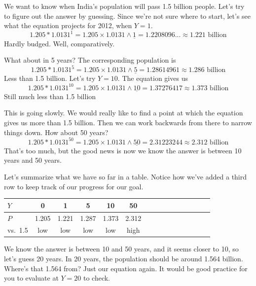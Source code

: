 We want to know when India's population will pass 1.5 billion people.  Let's try to figure out the answer by guessing.  Since we're not sure where to start, let's see what the equation projects for 2012, when $Y=1$. 
$$1.205 \ast 1.0131^1 = 1.205 \times 1.0131 \wedge \underline{1} = 1.2208096... \approx 1.221 \text{ billion}$$ 
Hardly budged.  Well, comparatively.  

What about in 5 years?  The corresponding population is 
$$1.205 \ast 1.0131^5 = 1.205 \times 1.0131 \wedge \underline{5} = 1.28614961\approx  1.286\text{ billion}$$ 
Less than 1.5 billion.  Let's try $Y=10$. The equation gives us 
$$1.205 \ast 1.0131^{10} = 1.205 \times 1.0131 \wedge \underline{10} = 1.37276417 \approx 1.373 \text{ billion}$$ 
Still much less than 1.5 billion

This is going slowly.  We would really like to find a point at which the equation gives us more than 1.5 billion. Then we can work backwards from there to narrow things down.  How about 50 years?  
$$1.205 \ast 1.0131^{50} = 1.205 \times 1.0131 \wedge \underline{50} = 2.31223244  \approx 2.312\text{ billion}$$ 
That's too much, but the good news is now we know the answer is between 10 years and 50 years.  

Let's summarize what we have so far in a table.  Notice how we've added a third row to keep track of our progress for our goal.

\begin{center}
\begin{tabular} {|l| |c |c |c |c |c |c |c |c |c |c |c|}\hline
$Y$ & 0 & 1 & 5 & 10 & 50 & \hspace{.25in}~&\hspace{.25in}~&\hspace{.25in}~&\hspace{.25in}~&\hspace{.25in}~&\hspace{.25in}~  \\ \hline
$P$ & 1.205 & 1.221 &1.287  & 1.373 & 2.312 &&&&&&  \\ \hline
vs.\ 1.5 & low & low & low & low & high &&&&&& \\ \hline
\end{tabular}
\end{center}

We know the answer is between 10 and 50 years, and it seems closer to 10, so let's guess 20 years.  In 20 years, the population should be around 1.564 billion.  Where's that 1.564 from?  Just our equation again.  It would be good practice for you to evaluate at $Y=20$ to check.  

